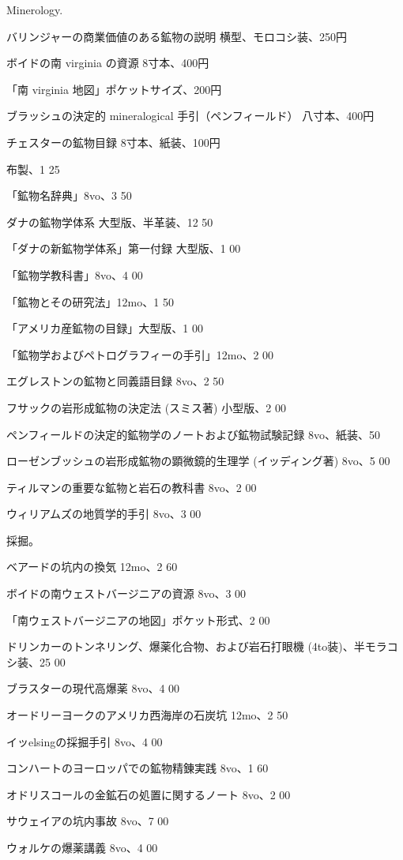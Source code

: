 \documentclass[a4paper,11pt,openany]{ltjsbook}
\begin{document}
Minerology.

バリンジャーの商業価値のある鉱物の説明 横型、モロコシ装、250円

ボイドの南 virginia の資源 8寸本、400円

「南 virginia 地図」ポケットサイズ、200円

ブラッシュの決定的 mineralogical 手引（ペンフィールド） 八寸本、400円

チェスターの鉱物目録 8寸本、紙装、100円

布製、1 25

「鉱物名辞典」8vo、3 50

ダナの鉱物学体系 大型版、半革装、12 50

「ダナの新鉱物学体系」第一付録 大型版、1 00

「鉱物学教科書」8vo、4 00

「鉱物とその研究法」12mo、1 50

「アメリカ産鉱物の目録」大型版、1 00

「鉱物学およびペトログラフィーの手引」12mo、2 00

エグレストンの鉱物と同義語目録 8vo、2 50

フサックの岩形成鉱物の決定法 (スミス著) 小型版、2 00

ペンフィールドの決定的鉱物学のノートおよび鉱物試験記録 8vo、紙装、50

ローゼンブッシュの岩形成鉱物の顕微鏡的生理学 (イッディング著) 8vo、5 00

ティルマンの重要な鉱物と岩石の教科書 8vo、2 00

ウィリアムズの地質学的手引 8vo、3 00

採掘。

ベアードの坑内の換気 12mo、2 60

ボイドの南ウェストバージニアの資源 8vo、3 00

「南ウェストバージニアの地図」ポケット形式、2 00

ドリンカーのトンネリング、爆薬化合物、および岩石打眼機 (4to装)、半モラコシ装、25 00

ブラスターの現代高爆薬 8vo、4 00

オードリーヨークのアメリカ西海岸の石炭坑 12mo、2 50

イッelsingの採掘手引 8vo、4 00

コンハートのヨーロッパでの鉱物精錬実践 8vo、1 60

オドリスコールの金鉱石の処置に関するノート 8vo、2 00

サウェイアの坑内事故 8vo、7 00

ウォルケの爆薬講義 8vo、4 00
\end{document}
